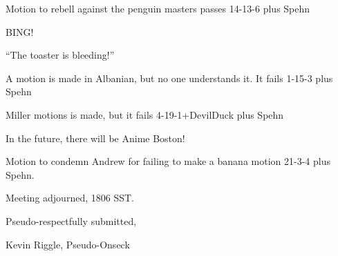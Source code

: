 \documentclass[10pt]{article}
\newcommand{\ps}{ plus Spehn\xspace}
\begin{document}
Motion to rebell against the penguin masters passes 14-13-6\ps

BING!

``The toaster is bleeding!''

A motion is made in Albanian, but no one understands it.  It fails 
1-15-3\ps

Miller motions is made, but it fails 4-19-1+DevilDuck\ps

In the future, there will be Anime Boston!

Motion to condemn Andrew for failing to make a banana motion 21-3-4\ps .

\vspace{12pt}

\noindent
Meeting adjourned, 1806 SST.

\vspace{18pt}

\centerline{Pseudo-respectfully submitted,}
\centerline{Kevin Riggle, Pseudo-Onseck}
\end{document}
